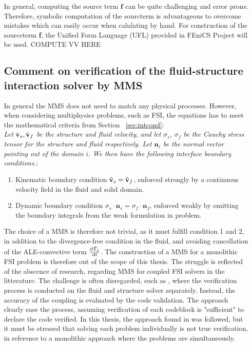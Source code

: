 In general, computing the source term $\mathbf{f}$ can be quite challenging and error prone.  Therefore, symbolic computation of the sourcterm is advantageous to overcome mistakes which can easily occur when calulating by hand. For construction of the sourceterm \textbf{f}, the Unified Form Language (UFL) \cite{Alnes2015} provided in FEniCS Project will be used. COMPUTE VV HERE

\subsection{Comment on verification of the fluid-structure interaction solver by MMS}
In general the MMS does not need to match any physical processes. However, when considering multiphysics problems, such as FSI, the equations has to meet the mathematical criteria from Section ~\ref{sec:intcond}: \\

\textit{Let $\hat{\mathbf{v}}_s, \hat{\mathbf{v}}_f$ be the structure and fluid velocity, and let $\sigma_s$, $\sigma_f$ be the Cauchy stress tensor for the structure and fluid respectively. Let $\mathbf{n}_i$ be the normal vector pointing out of the domain $i$. We then have the following interface boundary conditions.}:
\begin{enumerate}
\item Kinematic boundary condition $\hat{\mathbf{v}}_s = \hat{\mathbf{v}}_f$, enforced strongly by a continuous velocity field in the fluid
        and solid domain.
\item Dynamic boundary condition $\sigma_s \cdot \mathbf{n}_s = \sigma_f \cdot \mathbf{n}_f$, enforced weakly by omitting the 
        boundary integrals from the weak formulation in problem.
\end{enumerate}
The choice of a MMS is therefore not trivial, as it must fulfill condition 1 and 2, in addition to the divergence-free condition in the fluid, and avoiding cancellation of the ALE-convective term $\frac{\partial \hat{T}_f}{\partial t}$.  The construction of a MMS for a monolithic FSI problem is therefore out of the scope of this thesis. The struggle is reflected of the abscence of research, regarding MMS for coupled FSI solvers in the litterature. The challenge is often disregarded, such as \cite{Sheldon2014}, where the verification process is conducted on the fluid and structure solver separately. Instead, the accuracy of the coupling is evaluated by the code validation. The approach clearly ease the process, assuming verification of each codeblock is "sufficient" to declare the code verified. In this thesis, the approach found in \cite{Sheldon2014} was followed, but it must be stressed that solving each problem individually is not true verification, in reference to a monolithic approach where the problems are simultaneously.

